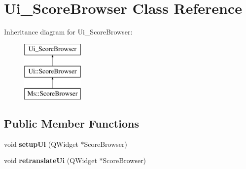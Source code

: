 \hypertarget{class_ui___score_browser}{}\section{Ui\+\_\+\+Score\+Browser Class Reference}
\label{class_ui___score_browser}
Inheritance diagram for Ui\+\_\+\+Score\+Browser\+:\begin{figure}[H]
\begin{center}
\leavevmode
\includegraphics[height=3.000000cm]{class_ui___score_browser}
\end{center}
\end{figure}
\subsection*{Public Member Functions}
\begin{DoxyCompactItemize}
\item 
\mbox{\label{class_ui___score_browser_a3abadc3f822516f9e3e157f2142520e5}} 
void {\bfseries setup\+Ui} (Q\+Widget $\ast$Score\+Browser)
\item 
\mbox{\label{class_ui___score_browser_abe8e10e1579193891441272a651d6251}} 
void {\bfseries retranslate\+Ui} (Q\+Widget $\ast$Score\+Browser)
\end{DoxyCompactItemize}
